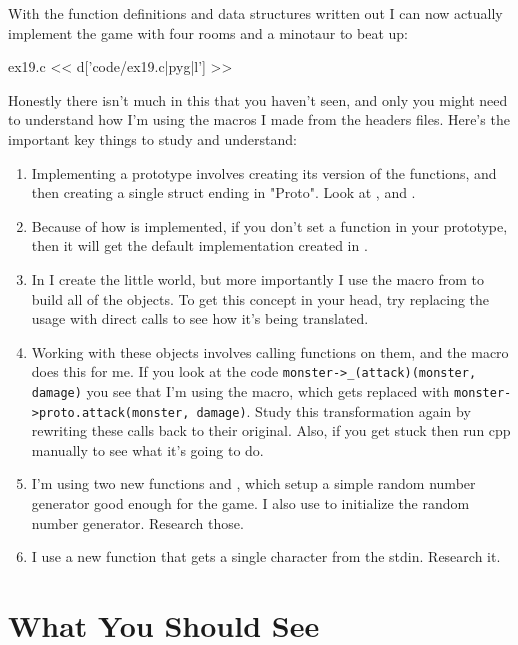With the function definitions and data structures written out I can now
actually implement the game with four rooms and a minotaur to beat up:

\begin{code}{ex19.c}
<< d['code/ex19.c|pyg|l'] >>
\end{code}

Honestly there isn't much in this that you haven't seen, and only you might
need to understand how I'm using the macros I made from the headers files.
Here's the important key things to study and understand:

\begin{enumerate}
\item Implementing a prototype involves creating its version of the
    functions, and then creating a single struct ending in "Proto".
    Look at ,  and .
\item Because of how  is implemented, if you don't set
    a function in your prototype, then it will get the default implementation
    created in .
\item In  I create the little world, but more importantly
    I use the  macro from  to build all of the
    objects.  To get this concept in your head, try replacing the 
    usage with direct  calls to see how it's being
    translated.
\item Working with these objects involves calling functions on them, and the
     macro does this for me.  If you look at the code
    \verb|monster->_(attack)(monster, damage)| you see that I'm using the
    macro, which gets replaced with \verb|monster->proto.attack(monster, damage)|.
    Study this transformation again by rewriting these calls back to their 
    original.  Also, if you get stuck then run cpp manually to see what it's
    going to do.
\item I'm using two new functions  and , which setup
    a simple random number generator good enough for the game.  I also use
     to initialize the random number generator.  Research those.
\item I use a new function  that gets a single character
    from the stdin.  Research it.
\end{enumerate}


\section{What You Should See}

